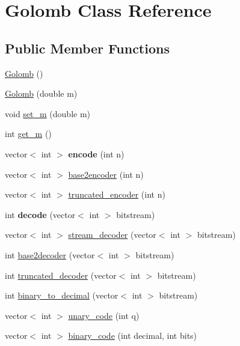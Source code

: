\hypertarget{classGolomb}{}\section{Golomb Class Reference}
\label{classGolomb}
\subsection*{Public Member Functions}
\begin{DoxyCompactItemize}
\item 
\hyperlink{classGolomb_aa6103d56ebec9decc11a69bf6be83208}{Golomb} ()
\item 
\hyperlink{classGolomb_aca358c8c3c8706b470c74f64f9509a64}{Golomb} (double m)
\item 
void \hyperlink{classGolomb_a8d8c2f271ad2e3716ddbba7fcde15619}{set\+\_\+m} (double m)
\item 
int \hyperlink{classGolomb_aa45900c84d473bbfc3d0de0b8879d10e}{get\+\_\+m} ()
\item 
\mbox{\label{classGolomb_a39581a9a0a9a68cce93fdb09005a3b3c}} 
vector$<$ int $>$ {\bfseries encode} (int n)
\item 
vector$<$ int $>$ \hyperlink{classGolomb_a91927ef00d074201fba0a176c7e11925}{base2encoder} (int n)
\item 
vector$<$ int $>$ \hyperlink{classGolomb_a2a12ea7e114395b3c20268a68ede3e29}{truncated\+\_\+encoder} (int n)
\item 
\mbox{\label{classGolomb_a6591f253a23651ae961e6cc9e9d26177}} 
int {\bfseries decode} (vector$<$ int $>$ bitstream)
\item 
vector$<$ int $>$ \hyperlink{classGolomb_a5116ab2ba314226543257204c66ced62}{stream\+\_\+decoder} (vector$<$ int $>$ bitstream)
\item 
int \hyperlink{classGolomb_a789cca4aa2ebfb18e2acd50565099ac9}{base2decoder} (vector$<$ int $>$ bitstream)
\item 
int \hyperlink{classGolomb_a395b68ea88abe771d02ba62aff2c559a}{truncated\+\_\+decoder} (vector$<$ int $>$ bitstream)
\item 
int \hyperlink{classGolomb_a13a756ac1e640acdccab04cead87d77b}{binary\+\_\+to\+\_\+decimal} (vector$<$ int $>$ bitstream)
\item 
vector$<$ int $>$ \hyperlink{classGolomb_aa5f4148a661789fb5035a4ed7e1aa133}{unary\+\_\+code} (int q)
\item 
vector$<$ int $>$ \hyperlink{classGolomb_a4ce5ce960d0e30505eb5b39e5dc84a6a}{binary\+\_\+code} (int decimal, int bits)
\end{DoxyCompactItemize}


